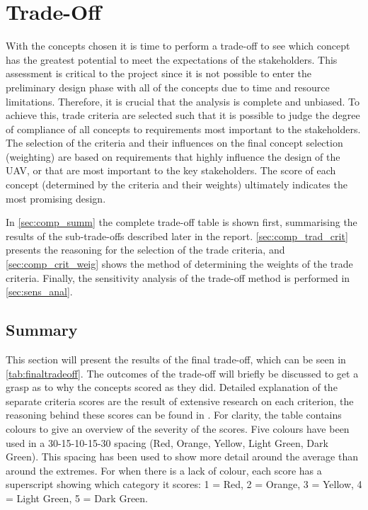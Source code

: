 \chapter{Trade-Off}
\label{ch:trad_off}
\setlength{\parindent}{15pt}

With the concepts chosen it is time to perform a trade-off to see which concept has the greatest potential to meet the expectations of the stakeholders. This assessment is critical to the project since it is not possible to enter the preliminary design phase with all of the concepts due to time and resource limitations. Therefore, it is crucial that the analysis is complete and unbiased. To achieve this, trade criteria are selected such that it is possible to judge the degree of compliance of all concepts to requirements most important to the stakeholders. The selection of the criteria and their influences on the final concept selection (weighting) are based on requirements that highly influence the design of the UAV, or that are most important to the key stakeholders. The score of each concept (determined by the criteria and their weights) ultimately indicates the most promising design.  

In \autoref{sec:comp_summ} the complete trade-off table is shown first, summarising the results of the sub-trade-offs described later in the report. \autoref{sec:comp_trad_crit} presents the reasoning for the selection of the trade criteria, and \autoref{sec:comp_crit_weig} shows the method of determining the weights of the trade criteria. Finally, the sensitivity analysis of the trade-off method is performed in \autoref{sec:sens_anal}.

\section{Summary}
\label{sec:comp_summ}


This section will present the results of the final trade-off, which can be seen in \autoref{tab:finaltradeoff}. The outcomes of the trade-off will briefly be discussed to get a grasp as to why the concepts scored as they did. Detailed explanation of the separate criteria scores are the result of extensive research on each criterion, the reasoning behind these scores can be found in . For clarity, the table contains colours to give an overview of the severity of the scores. Five colours have been used in a 30-15-10-15-30 spacing (Red, Orange, Yellow, Light Green, Dark Green). This spacing has been used to show more detail around the average than around the extremes. For when there is a lack of colour, each score has a superscript showing which category it scores: 1 = Red, 2 = Orange, 3 = Yellow, 4 = Light Green, 5 = Dark Green. 

